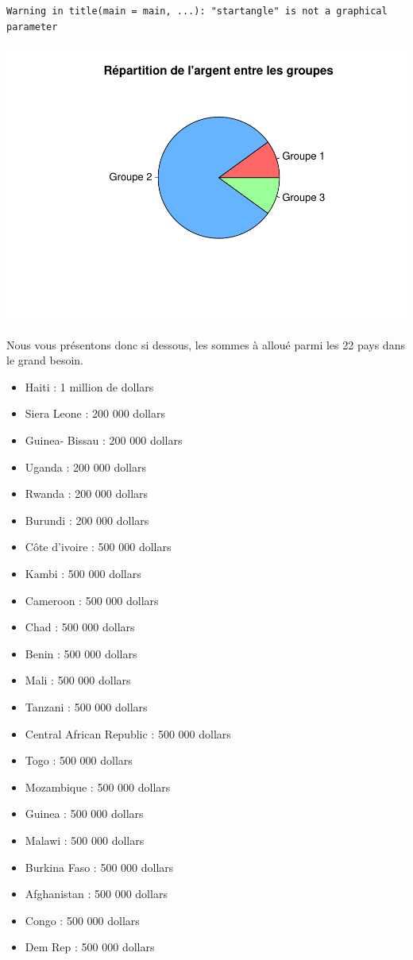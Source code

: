 \documentclass[
]{article}
\providecommand{\tightlist}{%
  \setlength{\itemsep}{0pt}\setlength{\parskip}{0pt}}
\begin{document}
\begin{verbatim}
Warning in title(main = main, ...): "startangle" is not a graphical parameter
\end{verbatim}

\includegraphics{Projet_files/figure-latex/unnamed-chunk-46-1.pdf}

Nous vous présentons donc si dessous, les sommes à alloué parmi les 22
pays dans le grand besoin.

\begin{itemize}
\tightlist
\item
  Haiti : 1 million de dollars
\item
  Siera Leone : 200 000 dollars
\item
  Guinea- Bissau : 200 000 dollars
\item
  Uganda : 200 000 dollars
\item
  Rwanda : 200 000 dollars
\item
  Burundi : 200 000 dollars
\item
  Côte d'ivoire : 500 000 dollars
\item
  Kambi : 500 000 dollars
\item
  Cameroon : 500 000 dollars
\item
  Chad : 500 000 dollars
\item
  Benin : 500 000 dollars
\item
  Mali : 500 000 dollars
\item
  Tanzani : 500 000 dollars
\item
  Central African Republic : 500 000 dollars
\item
  Togo : 500 000 dollars
\item
  Mozambique : 500 000 dollars
\item
  Guinea : 500 000 dollars
\item
  Malawi : 500 000 dollars
\item
  Burkina Faso : 500 000 dollars
\item
  Afghanistan : 500 000 dollars
\item
  Congo : 500 000 dollars
\item
  Dem Rep : 500 000 dollars
\end{itemize}
\end{document}

